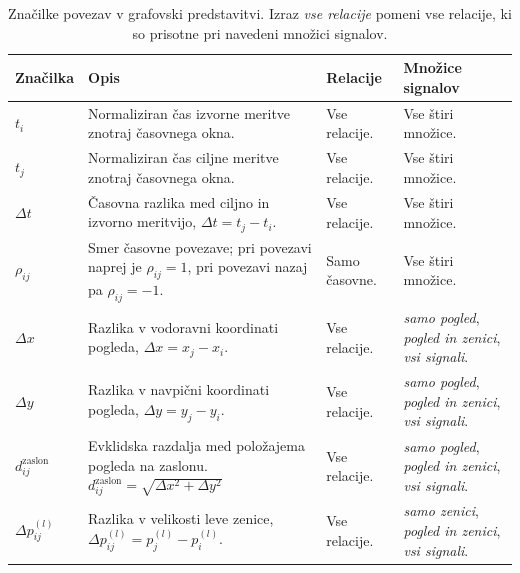 \begin{table}[H]
    \centering
    \caption{Značilke povezav v grafovski predstavitvi. Izraz \emph{vse relacije} pomeni vse relacije, ki so prisotne pri navedeni množici signalov.}
    \label{tab:znacilke-povezav}
    \begingroup
    \small
    \begin{tabularx}{\textwidth}{@{}>{\raggedright\arraybackslash}p{} >{\raggedright\arraybackslash}X >{\raggedright\arraybackslash}p{} >{\raggedright\arraybackslash}p{}@{}}
        \toprule
        \textbf{Značilka} & \textbf{Opis} & \textbf{Relacije} & \textbf{Množice signalov} \\
        \midrule
        \textcolor{tableTime}{$t_i$} & Normaliziran čas izvorne meritve znotraj časovnega okna. & Vse relacije. & Vse štiri množice. \\
        \midrule
        \textcolor{tableTime}{$t_j$} & Normaliziran čas ciljne meritve znotraj časovnega okna. & Vse relacije. & Vse štiri množice. \\
        \midrule
        \textcolor{tableTime}{$\Delta t$} & Časovna razlika med ciljno in izvorno meritvijo, \textcolor{tableTime}{$\Delta t = t_j - t_i$}. & Vse relacije. & Vse štiri množice. \\
        \midrule
        \textcolor{tableTime}{$\rho_{ij}$} & Smer časovne povezave; pri povezavi naprej je \textcolor{tableTime}{$\rho_{ij}=1$}, pri povezavi nazaj pa \textcolor{tableTime}{$\rho_{ij}=-1$}. & Samo časovne. & Vse štiri množice. \\
        \midrule
        \textcolor{tableGaze}{$\Delta x$} & Razlika v vodoravni koordinati pogleda, \textcolor{tableGaze}{$\Delta x = x_j - x_i$}. & Vse relacije. & \emph{samo pogled}, \emph{pogled in zenici}, \emph{vsi signali}. \\
        \midrule
        \textcolor{tableGaze}{$\Delta y$} & Razlika v navpični koordinati pogleda, \textcolor{tableGaze}{$\Delta y = y_j - y_i$}. & Vse relacije. & \emph{samo pogled}, \emph{pogled in zenici}, \emph{vsi signali}. \\
        \midrule
        \textcolor{tableGaze}{$d_{ij}^{\text{zaslon}}$} & Evklidska razdalja med položajema pogleda na zaslonu. \textcolor{tableGaze}{$d_{ij}^{\text{zaslon}} = \sqrt{\Delta x^2 + \Delta y^2}$} & Vse relacije. & \emph{samo pogled}, \emph{pogled in zenici}, \emph{vsi signali}. \\
        \midrule
        \textcolor{tablePupil}{$\Delta p^{(l)}_{ij}$} & Razlika v velikosti leve zenice, \textcolor{tablePupil}{$\Delta p^{(l)}_{ij} = p_j^{(l)} - p_i^{(l)}$}. & Vse relacije. & \emph{samo zenici}, \emph{pogled in zenici}, \emph{vsi signali}. \\

\end{tabularx}
\end{table}
